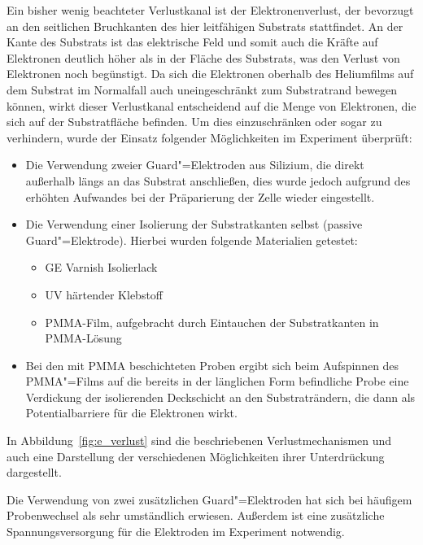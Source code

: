 Ein bisher wenig beachteter Verlustkanal ist der Elektronenverlust, der bevorzugt an den seitlichen Bruchkanten des hier leitfähigen Substrats stattfindet. An der Kante des Substrats ist das elektrische Feld und somit auch die Kräfte auf Elektronen deutlich höher als in der Fläche des Substrats, was den Verlust von Elektronen noch begünstigt. Da sich die Elektronen oberhalb des Heliumfilms auf dem Substrat im Normalfall auch uneingeschränkt zum Substratrand bewegen können, wirkt dieser Verlustkanal entscheidend auf die Menge von Elektronen, die sich auf der Substratfläche befinden. Um dies einzuschränken oder sogar zu verhindern, wurde der Einsatz folgender Möglichkeiten im Experiment überprüft:
\begin{itemize}
    \item Die Verwendung zweier Guard"=Elektroden aus Silizium, die direkt außerhalb längs an das Substrat anschließen, dies wurde jedoch aufgrund des erhöhten Aufwandes bei der Präparierung der Zelle wieder eingestellt.
    \item Die Verwendung einer Isolierung der Substratkanten selbst (passive Guard"=Elektrode). Hierbei wurden folgende Materialien getestet:
    \begin{itemize}
        \item GE Varnish Isolierlack
        \item UV härtender Klebstoff
        \item PMMA-Film, aufgebracht durch Eintauchen der Substratkanten in PMMA-Lösung
    \end{itemize}
    \item Bei den mit PMMA beschichteten Proben ergibt sich beim Aufspinnen des PMMA"=Films auf die bereits in der länglichen Form befindliche Probe eine Verdickung der isolierenden Deckschicht an den Substraträndern, die dann als Potentialbarriere für die Elektronen wirkt. 
\end{itemize}

In Abbildung~\ref{fig:e_verlust} sind die beschriebenen Verlustmechanismen und auch eine Darstellung der verschiedenen Möglichkeiten ihrer Unterdrückung dargestellt.

Die Verwendung von zwei zusätzlichen Guard"=Elektroden hat sich bei häufigem Probenwechsel als sehr umständlich erwiesen. Außerdem ist eine zusätzliche Spannungsversorgung für die Elektroden im Experiment notwendig.

